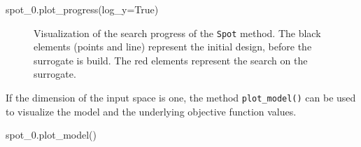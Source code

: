 \documentclass[
  letterpaper,
  DIV=11,
  numbers=noendperiod]{scrreprt}
\newenvironment{Shaded}{\begin{snugshade}}{\end{snugshade}}
\newcommand{\NormalTok}[1]{\textcolor[rgb]{0.00,0.23,0.31}{#1}}
\newcommand{\OperatorTok}[1]{\textcolor[rgb]{0.37,0.37,0.37}{#1}}
\newcommand{\VariableTok}[1]{\textcolor[rgb]{0.07,0.07,0.07}{#1}}
\begin{document}
\begin{Shaded}
\begin{Highlighting}[]
\NormalTok{spot\_0.plot\_progress(log\_y}\OperatorTok{=}\VariableTok{True}\NormalTok{)}
\end{Highlighting}
\end{Shaded}

\begin{figure}[H]


\caption{\label{fig-spot-progress}Visualization of the search progress
of the \texttt{Spot} method. The black elements (points and line)
represent the initial design, before the surrogate is build. The red
elements represent the search on the surrogate.}

\end{figure}%

If the dimension of the input space is one, the method
\texttt{plot\_model()} can be used to visualize the model and the
underlying objective function values.

\begin{Shaded}
\begin{Highlighting}[]
\NormalTok{spot\_0.plot\_model()}
\end{Highlighting}
\end{Shaded}
\end{document}

